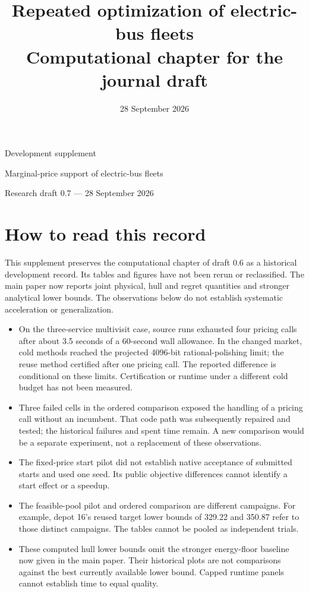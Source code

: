 \documentclass[11pt]{article}
\title{Repeated optimization of electric-bus fleets\\[0.35em]
\large Computational chapter for the journal draft}
\author{}
\date{28 September 2026}
\begin{document}
\begin{center}
{\LARGE Development supplement\par}
\vspace{0.5em}
{\large Marginal-price support of electric-bus fleets\par}
\vspace{0.5em}
Research draft 0.7 --- 28 September 2026
\end{center}
\section*{How to read this record}
This supplement preserves the computational chapter of draft 0.6 as a
historical development record. Its tables and figures have not been rerun or
reclassified. The main paper now reports joint physical, hull and regret
quantities and stronger analytical lower bounds. The observations below
do not establish systematic acceleration or generalization.

\begin{itemize}
\item On the three-service multivisit case, source runs exhausted four pricing
calls after about 3.5 seconds of a 60-second wall allowance. In the changed
market, cold methods reached the projected 4096-bit rational-polishing limit;
the reuse method certified after one pricing call. The reported difference
is conditional on these limits. Certification or runtime under a different
cold budget has not been measured.
\item Three failed cells in the ordered comparison exposed the handling of a
pricing call without an incumbent. That code path was subsequently repaired
and tested; the historical failures and spent time remain. A new comparison
would be a separate experiment, not a replacement of these observations.
\item The fixed-price start pilot did not establish native acceptance of
submitted starts and used one seed. Its public objective differences cannot
identify a start effect or a speedup.
\item The feasible-pool pilot and ordered comparison are different campaigns.
For example, depot 16's reused target lower bounds of 329.22 and 350.87 refer
to those distinct campaigns. The tables cannot be pooled as independent trials.
\item These computed hull lower bounds omit the stronger energy-floor baseline
now given in the main paper. Their historical plots are not comparisons
against the best currently available lower bound. Capped runtime panels
cannot establish time to equal quality.
\end{itemize}
\end{document}
